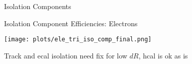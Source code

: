 \documentclass{beamer}
\begin{document}
\begin{frame}{Isolation Components}
  
\end{frame}

\begin{frame}{Isolation Component Efficiencies: Electrons}
  \begin{center}
    
\texttt{[image: plots/ele\_tri\_iso\_comp\_final.png]}

    Track and ecal isolation need fix for low $dR$, hcal is ok as is
  \end{center}
\end{frame}
\end{document}
